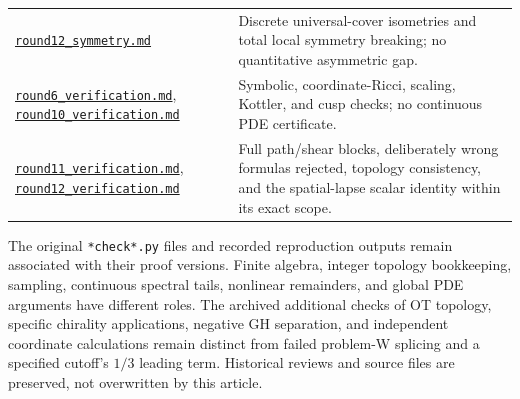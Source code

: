 \documentclass[a4paper,11pt]{article}
\theoremstyle{definition}
\begin{document}
\begin{longtable}{L{.34\textwidth}L{.59\textwidth}}
\href{../references/rounds/round12_symmetry.md}{\nolinkurl{round12_symmetry.md}}
& Discrete universal-cover isometries and total local symmetry breaking; no quantitative asymmetric gap.\\
\href{../references/rounds/round6_verification.md}{\nolinkurl{round6_verification.md}},
\href{../references/rounds/round10_verification.md}{\nolinkurl{round10_verification.md}}
& Symbolic, coordinate-Ricci, scaling, Kottler, and cusp checks; no continuous PDE certificate.\\
\href{../references/rounds/round11_verification.md}{\nolinkurl{round11_verification.md}},
\href{../references/rounds/round12_verification.md}{\nolinkurl{round12_verification.md}}
& Full path/shear blocks, deliberately wrong formulas rejected, topology consistency, and the spatial-lapse scalar identity within its exact scope.\\
\bottomrule
\end{longtable}
\normalsize
The original \nolinkurl{*check*.py} files and recorded reproduction
outputs remain associated with their proof versions. Finite algebra,
integer topology bookkeeping, sampling, continuous spectral tails,
nonlinear remainders, and global PDE arguments have different roles.
The archived additional checks of OT topology, specific chirality
applications, negative GH separation, and independent coordinate
calculations remain distinct from failed problem-W splicing and a
specified cutoff's $1/3$ leading term. Historical reviews and source
files are preserved, not overwritten by this article.
\end{document}
